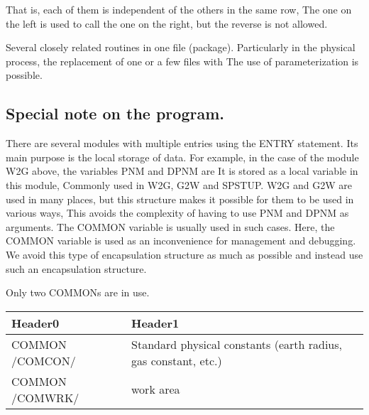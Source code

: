 That is, each of them is independent of the others in the same row, The
one on the left is used to call the one on the right, but the reverse is
not allowed.

Several closely related routines in one file (package). Particularly in
the physical process, the replacement of one or a few files with The use
of parameterization is possible.

\hypertarget{special-note-on-the-program.}{%
\subsection{Special note on the
program.}\label{special-note-on-the-program.}}

There are several modules with multiple entries using the ENTRY
statement. Its main purpose is the local storage of data. For example,
in the case of the module W2G above, the variables PNM and DPNM are It
is stored as a local variable in this module, Commonly used in W2G, G2W
and SPSTUP. W2G and G2W are used in many places, but this structure
makes it possible for them to be used in various ways, This avoids the
complexity of having to use PNM and DPNM as arguments. The COMMON
variable is usually used in such cases. Here, the COMMON variable is
used as an inconvenience for management and debugging. We avoid this
type of encapsulation structure as much as possible and instead use such
an encapsulation structure.

Only two COMMONs are in use.

\begin{longtable}[]{@{}ll@{}}
\toprule
\begin{minipage}[b]{0.47\columnwidth}\raggedright
Header0\strut
\end{minipage} & \begin{minipage}[b]{0.47\columnwidth}\raggedright
Header1\strut
\end{minipage}\tabularnewline
\midrule
\endhead
\begin{minipage}[t]{0.47\columnwidth}\raggedright
COMMON /COMCON/\strut
\end{minipage} & \begin{minipage}[t]{0.47\columnwidth}\raggedright
Standard physical constants (earth radius, gas constant, etc.)\strut
\end{minipage}\tabularnewline
\begin{minipage}[t]{0.47\columnwidth}\raggedright
COMMON /COMWRK/\strut
\end{minipage} & \begin{minipage}[t]{0.47\columnwidth}\raggedright
work area\strut
\end{minipage}\tabularnewline
\bottomrule
\end{longtable}


